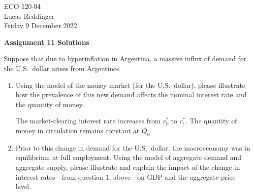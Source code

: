 \documentclass[
    letterpaper,paper=portrait,fleqn,
    DIV=16,fontsize=12pt,twoside=semi,
    parskip=full-,
    headings=standardclasses]
{scrartcl}
\begin{document}
\RaggedRight
\thispagestyle{plain}

ECO 120-04 \\
Lucas Reddinger \\
Friday 9 December 2022

\vspace{0.7\baselineskip}
\textbf{\LARGE Assignment 11 Solutions}

Suppose that due to hyperinflation in Argentina, a massive influx of demand for the U.S.~dollar arises from Argentines.

\begin{enumerate}

\item Using the model of the money market (for the U.S.~dollar), please illustrate how the prevalence of this new demand affects the nominal interest rate and the quantity of money.

\begin{solution}

The market-clearing interest rate increases from $r^*_0$ to $r^*_1$. The quantity of money in circulation remains constant at $\overline{Q}_0$.
\end{solution}

\item Prior to this change in demand for the U.S.~dollar, the macroeconomy was in equilibrium at full employment. Using the model of aggregate demand and aggregate supply, please illustrate and explain the impact of the change in interest rates---from question 1, above---on GDP and the aggregate price level.

\begin{solution}
\end{solution}
\end{enumerate}
\end{document}
